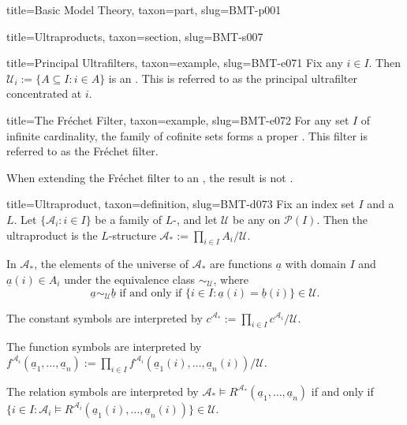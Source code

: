 \documentclass[a4paper]{article}
\begin{document}
\begin{tree}{title={Basic Model Theory}, taxon={part}, slug={BMT-p001}}
\begin{tree}{title={Ultraproducts}, taxon={section}, slug={BMT-s007}}
\begin{tree}{title={Principal Ultrafilters}, taxon={example}, slug={BMT-e071}}
Fix any \(i \in  I\). Then \(\mathcal {U}_i :=  \{ A \subseteq  I: i \in  A \}\) is an . This is referred to as the principal ultrafilter concentrated at \(i\).
\end{tree}

\begin{tree}{title={The Fréchet Filter}, taxon={example}, slug={BMT-e072}}
For any set \(I\) of infinite cardinality, the family of cofinite sets forms a proper . This filter is referred to as the Fréchet filter.\par{When extending the Fréchet filter to an , the result is not .}
\end{tree}

\begin{tree}{title={Ultraproduct}, taxon={definition}, slug={BMT-d073}}
Fix an index set \(I\) and a  \(L\). Let \(\{ \mathcal {A}_i: i \in  I \}\) be a family of \(L\)-, and let \(\mathcal {U}\) be any  on \(\mathcal {P}(I)\). Then the ultraproduct is the \(L\)-structure \(\mathcal {A}_* :=  \prod \limits _{i \in  I} A_i / \mathcal {U}\). \par{In \(\mathcal {A}_*\), the elements of the universe of \(\mathcal {A}_*\) are functions \(\underline {a}\) with domain \(I\) and \(\underline {a}(i) \in  A_i\) under the equivalence class \(\sim _{ \mathcal {U}}\), where \[\underline {a} \sim _{ \mathcal {U}} \underline {b}  \text { if and only if } \{ i \in  I:  \underline {a}(i)= \underline {b}(i) \}   \in   \mathcal {U}.\]}\par{The constant symbols are interpreted by \(c^{ \mathcal {A}_*} :=  \prod \limits _{i \in  I} c^{ \mathcal {A}_i} / \mathcal {U}\). }\par{The function symbols are interpreted by \(f^{ \mathcal {A}_i}( \underline {a}_1, \dots ,  \underline {a}_n) :=  \prod \limits _{i \in  I} f^{ \mathcal {A}_i}( \underline {a}_1(i), \dots , \underline {a}_n(i)) /  \mathcal {U} \). }\par{The relation symbols are interpreted by \(\mathcal {A}_* \models  R^{ \mathcal {A}_*}( \underline {a}_1, \dots ,  \underline {a}_n)\) if and only if \(\{ i \in  I:  \mathcal {A}_i \models  R^{ \mathcal {A}_i}( \underline {a}_1(i), \dots ,  \underline {a}_n(i)) \} \in   \mathcal {U}\).}
\end{tree}


\end{tree}
\end{tree}
\end{document}
